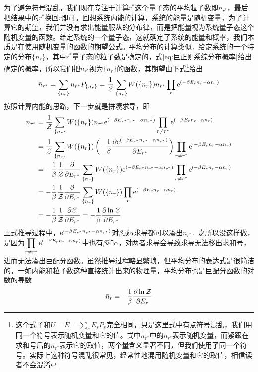 \documentclass[../../main.tex]{subfiles}
\begin{document}
为了避免符号混乱，我们现在专注于计算\(r^*\)这个量子态的平均粒子数即\(\bar{n}_{r^*}\)，最后把结果中的\(r^*\)换回\(r\)即可。回想系统内能的计算，系统的能量是随机变量，为了计算它的期望，我们并没有求出能量服从的分布律，而是把能量视为系统量子态这个随机变量的函数。给定系统的一个量子态，这就确定了系统的能量和概率，我们本质是在使用随机变量的函数的期望公式。平均分布的计算类似，给定系统的一个特定的分布\(\{n_r\}\)，其中\(r^*\)量子态的粒子数是确定的，式\eqref{eq:巨正则系综分布概率}给出确定的概率，所以我们把\(n_{r^*}\)视为\(\{n_r\}\)的函数，其期望由下式\footnote{这个式子和\(U=\bar{E}=\sum_s E_sP_s\)完全相同，只是这里式中有点符号混乱，我们用同一个符号表示随机变量和它的值。式中\(\bar{n}_{r^*}\)中的\(n_{r^*}\)表示随机变量，而紧跟在求和号后的\(n_{r^*}\)表示它的取值，两个量含义显著不同，但我们使用了同一个符号。实际上这种符号混乱很常见，经常性地混用随机变量和它的取值，相信读者不会混淆}给出
\begin{equation}
    \bar{n}_{r^*}=\sum_{\{n_r\}}n_{r^*}P_{\{n_r\}}=\frac{1}{\mathcal{Z}}\sum_{\{n_r\}}W(\{n_r\})n_{r^*}\prod_r \mathrm{e}^{(-\beta E_rn_r-\alpha n_r)}
\end{equation}
按照计算内能的思路，下一步就是拼凑求导，即
\begin{equation}
    \begin{split}
        \bar{n}_{r^*}&=\frac{1}{\mathcal{Z}}\sum_{\{n_r\}}W(\{n_r\})n_{r^*}\mathrm{e}^{(-\beta E_{r^*}n_{r^*}-\alpha n_{r^*})}\prod_{r\neq r^*} \mathrm{e}^{(-\beta E_rn_r-\alpha n_r)} \\
        &=\frac{1}{\mathcal{Z}}\sum_{\{n_r\}}W(\{n_r\})\left(-\frac{1}{\beta}\pdv{\mathrm{e}^{(-\beta E_{r^*}n_{r^*}-\alpha n_{r^*})}}{E_{r^*}}\right)\prod_{r\neq r^*} \mathrm{e}^{(-\beta E_rn_r-\alpha n_r)} \\
        &=-\frac{1}{\beta}\frac{1}{\mathcal{Z}}\pdv{E_{r^*}}\sum_{\{n_r\}}W(\{n_r\})\mathrm{e}^{(-\beta E_{r^*}n_{r^*}-\alpha n_{r^*})}\prod_{r\neq r^*} \mathrm{e}^{(-\beta E_rn_r-\alpha n_r)} \\
        &=-\frac{1}{\beta}\frac{1}{\mathcal{Z}}\pdv{E_{r^*}}\sum_{\{n_r\}}W(\{n_r\})\prod_{r} \mathrm{e}^{(-\beta E_rn_r-\alpha n_r)} \\
        &=-\frac{1}{\beta}\frac{1}{\mathcal{Z}}\pdv{\mathcal{Z}}{E_{r^*}}=-\frac{1}{\beta}\pdv{\ln\mathcal{Z}}{E_{r^*}}
    \end{split}
\end{equation}
上式推导过程中，\(\mathrm{e}^{(-\beta E_{r^*}n_{r^*}-\alpha n_{r^*})}\)对\(\beta\)或\(\alpha\)求导都可以凑出\(n_{r^*}\)，之所以没这样做，是因为\(\displaystyle \prod_{r\neq r^*} \mathrm{e}^{(-\beta E_rn_r-\alpha n_r)}\)中也有\(\beta\)和\(\alpha\)，对两者求导会导致求导无法移出求和号，进而无法凑出巨配分函数。虽然推导过程略显繁琐，但平均分布的表达式是很简洁的，一如内能和粒子数这种直接统计出来的物理量，平均分布也是巨配分函数的对数的导数
\begin{equation}
    \bar{n}_r=-\frac{1}{\beta}\pdv{\ln\mathcal{Z}}{E_r}
\end{equation}
\end{document}
